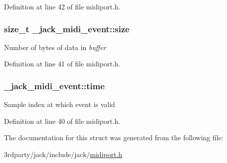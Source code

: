 \-Definition at line 42 of file midiport.\-h.

\hypertarget{struct__jack__midi__event_abc254ee669d342c75ccfa49658b54a56}{
\subsubsection[{size}]{\setlength{\rightskip}{0pt plus 5cm}size\-\_\-t {\bf \-\_\-jack\-\_\-midi\-\_\-event\-::size}}}\label{d1/dfe/struct__jack__midi__event_abc254ee669d342c75ccfa49658b54a56}
\-Number of bytes of data in {\itshape buffer\/} 

\-Definition at line 41 of file midiport.\-h.

\hypertarget{struct__jack__midi__event_a7acc6a81ac12e2a042d5af9fb7b56532}{
\subsubsection[{time}]{ {\bf \-\_\-jack\-\_\-midi\-\_\-event\-::time}}}\label{d1/dfe/struct__jack__midi__event_a7acc6a81ac12e2a042d5af9fb7b56532}
\-Sample index at which event is valid 

\-Definition at line 40 of file midiport.\-h.



\-The documentation for this struct was generated from the following file\-:\begin{DoxyCompactItemize}
\item 
3rdparty/jack/include/jack/\hyperlink{midiport_8h}{midiport.\-h}\end{DoxyCompactItemize}
